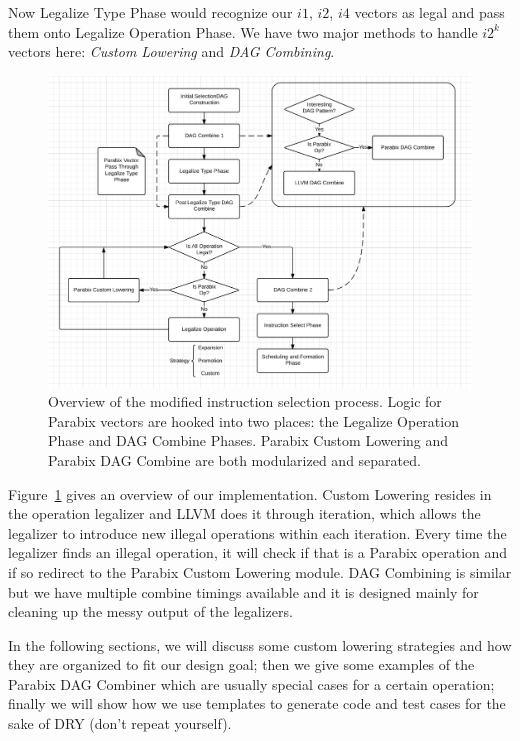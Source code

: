 Now Legalize Type Phase would recognize our $i1$, $i2$, $i4$ vectors as legal and pass them onto Legalize Operation Phase. We have two major methods to handle $i2^k$ vectors here: \textit{Custom Lowering} and \textit{DAG Combining}.

\begin{figure}[ht!]
\centering
\includegraphics[width=140mm]{draw/system.png}
\caption[System overview: modified instruction selection process]{Overview of the modified instruction selection process. Logic for Parabix vectors are hooked into two places: the Legalize Operation Phase and DAG Combine Phases. Parabix Custom Lowering and Parabix DAG Combine are both modularized and separated.}
\label{figure:system}
\end{figure}

Figure~\ref{figure:system} gives an overview of our implementation. Custom Lowering resides in the operation legalizer and LLVM does it through iteration, which allows the legalizer to introduce new illegal operations within each iteration. Every time the legalizer finds an illegal operation, it will check if that is a Parabix operation and if so redirect to the Parabix Custom Lowering module. DAG Combining is similar but we have multiple combine timings available and it is designed mainly for cleaning up the messy output of the legalizers.

In the following sections, we will discuss some custom lowering strategies and how they are organized to fit our design goal; then we give some examples of the Parabix DAG Combiner which are usually special cases for a certain operation; finally we will show how we use templates to generate code and test cases for the sake of DRY (don't repeat yourself).


